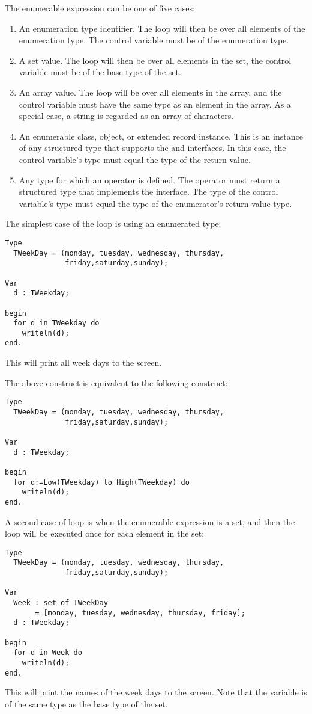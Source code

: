 The enumerable expression can be one of five cases:
\begin{enumerate}
\item An enumeration type identifier. The loop will then be over all
elements of the enumeration type. The control variable must be of the
enumeration type.
\item A set value. The loop will then be over all elements in the set, the
control variable must be of the base type of the set.
\item An array value. The loop will be over all elements in the array, and
the control variable must have the same type as an element in the array.
As a special case, a string is regarded as an array of characters.
\item An enumerable class, object, or extended record instance. This is an instance of any
structured type that supports the  and  interfaces.
In this case, the control variable's type must equal the type of the
 return value.
\item Any type for which an  operator is defined. The
 operator must return a structured type that implements the
 interface. The type of the control variable's type
must equal the type of the enumerator's  return
value type.
\end{enumerate}

The simplest case of the  loop is using an enumerated type:
\begin{verbatim}
Type
  TWeekDay = (monday, tuesday, wednesday, thursday,
              friday,saturday,sunday);

Var
  d : TWeekday;

begin
  for d in TWeekday do
    writeln(d);
end.
\end{verbatim}
This will print all week days to the screen.

The above  construct is equivalent to the following
 construct:
\begin{verbatim}
Type
  TWeekDay = (monday, tuesday, wednesday, thursday,
              friday,saturday,sunday);

Var
  d : TWeekday;

begin
  for d:=Low(TWeekday) to High(TWeekday) do
    writeln(d);
end.
\end{verbatim}

A second case of  loop is when the enumerable expression is a set,
and then the loop will be executed once for each element in the set:
\begin{verbatim}
Type
  TWeekDay = (monday, tuesday, wednesday, thursday,
              friday,saturday,sunday);

Var
  Week : set of TWeekDay
       = [monday, tuesday, wednesday, thursday, friday];
  d : TWeekday;

begin
  for d in Week do
    writeln(d);
end.
\end{verbatim}
This will print the names of the week days to the screen. Note that the
variable  is of the same type as the base type of the set.

